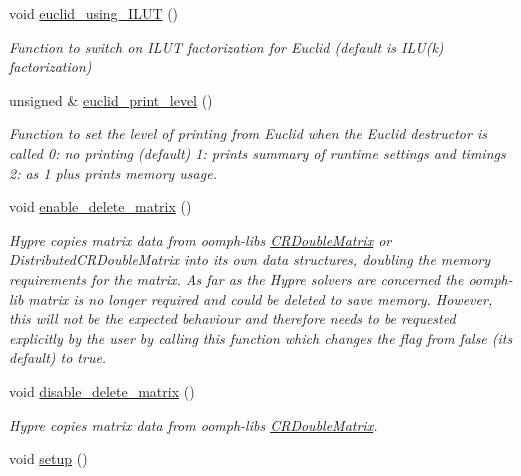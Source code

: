\begin{DoxyCompactItemize}
void \hyperlink{classoomph_1_1HyprePreconditioner_a55b6027d5212c7e66eec212341dd0af6}{euclid\+\_\+using\+\_\+\+I\+L\+UT} ()
\begin{DoxyCompactList}\small\item\em Function to switch on I\+L\+UT factorization for Euclid (default is I\+L\+U(k) factorization) \end{DoxyCompactList}\item 
unsigned \& \hyperlink{classoomph_1_1HyprePreconditioner_a8be8b1933ac9cc1a3b6f4977d92e615c}{euclid\+\_\+print\+\_\+level} ()
\begin{DoxyCompactList}\small\item\em Function to set the level of printing from Euclid when the Euclid destructor is called 0\+: no printing (default) 1\+: prints summary of runtime settings and timings 2\+: as 1 plus prints memory usage. \end{DoxyCompactList}\item 
void \hyperlink{classoomph_1_1HyprePreconditioner_a350716ddfca241e83904895e0d5c3f6f}{enable\+\_\+delete\+\_\+matrix} ()
\begin{DoxyCompactList}\small\item\em Hypre copies matrix data from oomph-\/lib\textquotesingle{}s \hyperlink{classoomph_1_1CRDoubleMatrix}{C\+R\+Double\+Matrix} or Distributed\+C\+R\+Double\+Matrix into its own data structures, doubling the memory requirements for the matrix. As far as the Hypre solvers are concerned the oomph-\/lib matrix is no longer required and could be deleted to save memory. However, this will not be the expected behaviour and therefore needs to be requested explicitly by the user by calling this function which changes the flag from false (its default) to true. \end{DoxyCompactList}\item 
void \hyperlink{classoomph_1_1HyprePreconditioner_a53c33cbd53d80d45ba2326273033f036}{disable\+\_\+delete\+\_\+matrix} ()
\begin{DoxyCompactList}\small\item\em Hypre copies matrix data from oomph-\/lib\textquotesingle{}s \hyperlink{classoomph_1_1CRDoubleMatrix}{C\+R\+Double\+Matrix}. \end{DoxyCompactList}\item 
void \hyperlink{classoomph_1_1HyprePreconditioner_a5622db3b409cbdc49887aa65fa35215a}{setup} ()

\end{DoxyCompactItemize}
